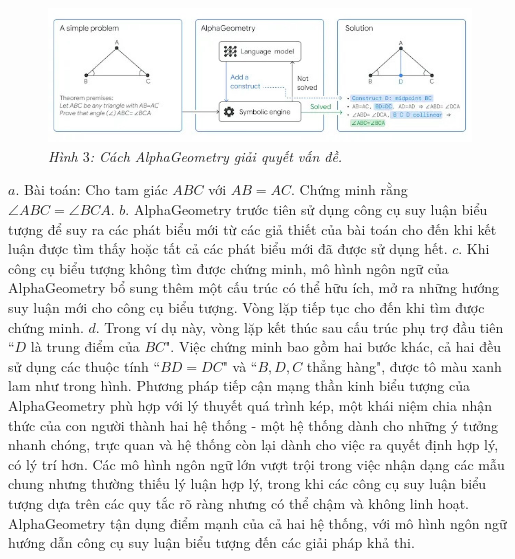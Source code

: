 \begin{multicols}{2}
	\begin{figure}[H]
		\vspace*{-5pt}
		\centering
		\captionsetup{labelformat= empty, justification=centering}
		\includegraphics[width= 1\linewidth]{SimpleGeometry.jpg}
		\caption{\small\textit{\color{timhieukhoahoc}Hình $3$: Cách AlphaGeometry giải quyết vấn đề.}}
		\vspace*{-10pt}
	\end{figure}
	$a.$ Bài toán: Cho tam giác $ABC$ với $AB = AC$. Chứng minh rằng $\angle ABC = \angle BCA$.
	\vskip 0.1cm
	$b.$ AlphaGeometry trước tiên sử dụng công cụ suy luận biểu tượng để suy ra các phát biểu mới từ các giả thiết của bài toán cho đến khi kết luận được tìm thấy hoặc tất cả các phát biểu mới đã được sử dụng hết. 
	\vskip 0.1cm
	$c.$ Khi công cụ biểu tượng không tìm được chứng minh, mô hình ngôn ngữ của AlphaGeometry bổ sung thêm một cấu trúc có thể hữu ích, mở ra những hướng suy luận mới cho công cụ biểu tượng. Vòng lặp tiếp tục cho đến khi tìm được chứng minh.
	\vskip 0.1cm	
	$d.$ Trong ví dụ này, vòng lặp kết thúc sau cấu trúc phụ trợ đầu tiên ``$D$ là trung điểm của $BC$". Việc chứng minh bao gồm hai bước khác, cả hai đều sử dụng các thuộc tính ``$BD =DC$" và ``$B, D, C$ thẳng hàng", được tô màu xanh lam như trong hình.
	\vskip 0.1cm
	Phương pháp tiếp cận mạng thần kinh biểu tượng của AlphaGeometry phù hợp với lý thuyết quá trình kép, một khái niệm chia nhận thức của con người thành hai hệ thống - một hệ thống dành cho những ý tưởng nhanh chóng, trực quan và hệ thống còn lại dành cho việc ra quyết định hợp lý, có lý trí hơn. Các mô hình ngôn ngữ lớn vượt trội trong việc nhận dạng các mẫu chung nhưng thường thiếu lý luận hợp lý, trong khi các công cụ suy luận biểu tượng dựa trên các quy tắc rõ ràng nhưng có thể chậm và không linh hoạt. AlphaGeometry tận dụng điểm mạnh của cả hai hệ thống, với mô hình ngôn ngữ hướng dẫn công cụ suy luận biểu tượng đến các giải pháp khả thi. 
	\begin{figure}[H]
		\vspace*{-5pt}
		\centering
		\captionsetup{labelformat= empty, justification=centering}

\end{figure}
\end{multicols}
